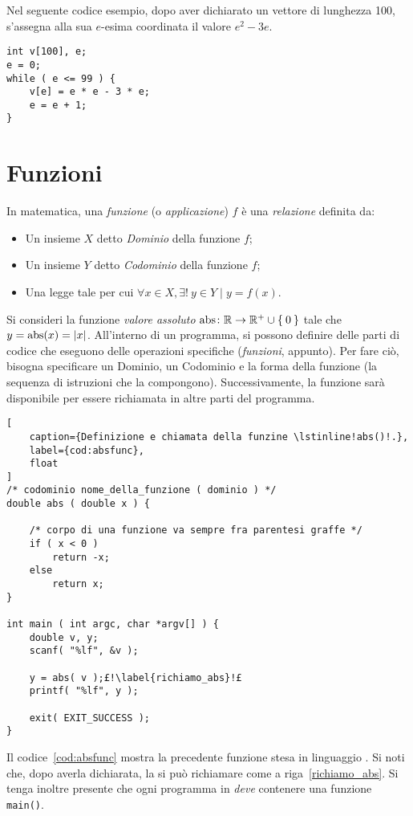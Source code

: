 Nel seguente codice esempio, dopo aver dichiarato un vettore di lunghezza \num{100}, s'assegna alla sua $e$-esima coordinata il valore $e^2-3e$.
\begin{lstlisting}
int v[100], e;
e = 0;
while ( e <= 99 ) {
	v[e] = e * e - 3 * e;
	e = e + 1;
}
\end{lstlisting}

	\section{Funzioni}
In matematica, una \emph{funzione} (o \emph{applicazione}) $f$ è una \emph{relazione} definita da:
\begin{itemize}
	\item
Un insieme $X$ detto \emph{Dominio} della funzione $f$;
	\item
Un insieme $Y$ detto \emph{Codominio} della funzione $f$;
	\item
Una legge tale per cui $\forall x \in X, \exists! \ y \in Y \mid y=f(x)$.
\end{itemize}

Si consideri la funzione \emph{valore assoluto} $\mathop{\mathrm{abs}}\colon\mathbb{R}\to\mathbb{R}^+\cup\Set{0}$ tale che $y = \mathop{\mathrm{abs}}(x)=\lvert x\rvert$.
All'interno di un programma, si possono definire delle parti di codice che eseguono delle operazioni specifiche (\emph{funzioni}, appunto).
Per fare ciò, bisogna specificare un Dominio, un Codominio e la forma della funzione (la sequenza di istruzioni che la compongono).
Successivamente, la funzione sarà disponibile per essere richiamata in altre parti del programma.


\begin{lstlisting}[
	caption={Definizione e chiamata della funzine \lstinline!abs()!.},
	label={cod:absfunc},
	float
]
/* codominio nome_della_funzione ( dominio ) */
double abs ( double x ) {

	/* corpo di una funzione va sempre fra parentesi graffe */
	if ( x < 0 )
		return -x;
	else
		return x;
}

int main ( int argc, char *argv[] ) {
	double v, y;
	scanf( "%lf", &v );

	y = abs( v );£!\label{richiamo_abs}!£
	printf( "%lf", y );

	exit( EXIT_SUCCESS );
}
\end{lstlisting}
Il codice~\ref{cod:absfunc} mostra la precedente funzione stesa in linguaggio .
Si noti che, dopo averla dichiarata, la si può richiamare come a riga~\ref{richiamo_abs}.
Si tenga inoltre presente che ogni programma in  \emph{deve} contenere una funzione \lstinline!main()!.



